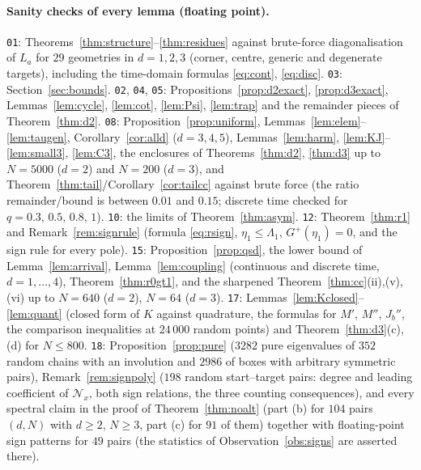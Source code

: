 \documentclass[11pt,a4paper]{article}
\theoremstyle{plain}
\theoremstyle{definition}
\numberwithin{equation}{section}
\begin{document}
\paragraph{Sanity checks of every lemma (floating point).}
\texttt{01}: Theorems~\ref{thm:structure}--\ref{thm:residues} against brute-force diagonalisation of $L_a$ for $29$ geometries in $d=1,2,3$ (corner, centre, generic and degenerate targets), including the time-domain formulas \eqref{eq:cont}, \eqref{eq:disc}. \texttt{03}: Section~\ref{sec:bounds}. \texttt{02}, \texttt{04}, \texttt{05}: Propositions~\ref{prop:d2exact}, \ref{prop:d3exact}, Lemmas~\ref{lem:cycle}, \ref{lem:cot}, \ref{lem:Psi}, \ref{lem:trap} and the remainder pieces of Theorem~\ref{thm:d2}. \texttt{08}: Proposition~\ref{prop:uniform}, Lemmas~\ref{lem:elem}--\ref{lem:taugen}, Corollary~\ref{cor:alld} ($d=3,4,5$), Lemmas~\ref{lem:harm}, \ref{lem:KJ}--\ref{lem:small3}, \ref{lem:C3}, the enclosures of Theorems~\ref{thm:d2}, \ref{thm:d3} up to $N=5000$ ($d=2$) and $N=200$ ($d=3$), and Theorem~\ref{thm:tail}/Corollary~\ref{cor:tailcc} against brute force (the ratio remainder/bound is between $0.01$ and $0.15$; discrete time checked for $q=0.3,\,0.5,\,0.8,\,1$). \texttt{10}: the limits of Theorem~\ref{thm:asym}. \texttt{12}: Theorem~\ref{thm:r1} and Remark~\ref{rem:signrule} (formula \eqref{eq:rsign}, $\eta_1\le\Lambda_1$, $G^+(\eta_1)=0$, and the sign rule for every pole). \texttt{15}: Proposition~\ref{prop:qsd}, the lower bound of Lemma~\ref{lem:arrival}, Lemma~\ref{lem:coupling} (continuous and discrete time, $d=1,\dots,4$), Theorem~\ref{thm:r0gt1}, and the sharpened Theorem~\ref{thm:cc}(ii),(v),(vi) up to $N=640$ ($d=2$), $N=64$ ($d=3$). \texttt{17}: Lemmas~\ref{lem:Kclosed}--\ref{lem:quant} (closed form of $K$ against quadrature, the formulas for $M'$, $M''$, $J_b''$, the comparison inequalities at $24\,000$ random points) and Theorem~\ref{thm:d3}(c),(d) for $N\le800$. \texttt{18}: Proposition~\ref{prop:pure} ($3282$ pure eigenvalues of $352$ random chains with an involution and $2986$ of boxes with arbitrary symmetric pairs), Remark~\ref{rem:signpoly} ($198$ random start--target pairs: degree and leading coefficient of $\mathcal N_x$, both sign relations, the three counting consequences), and every spectral claim in the proof of Theorem~\ref{thm:noalt} (part (b) for $104$ pairs $(d,N)$ with $d\ge2$, $N\ge3$, part (c) for $91$ of them) together with floating-point sign patterns for $49$ pairs (the statistics of Observation~\ref{obs:signs} are asserted there).
\end{document}

